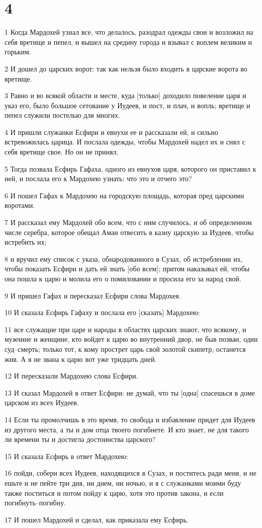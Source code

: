 \chapter{4}

\par 1 Когда Мардохей узнал все, что делалось, разодрал одежды свои и возложил на себя вретище и пепел, и вышел на средину города и взывал с воплем великим и горьким.
\par 2 И дошел до царских ворот; так как нельзя было входить в царские ворота во вретище.
\par 3 Равно и во всякой области и месте, куда [только] доходило повеление царя и указ его, было большое сетование у Иудеев, и пост, и плач, и вопль; вретище и пепел служили постелью для многих.
\par 4 И пришли служанки Есфири и евнухи ее и рассказали ей, и сильно встревожилась царица. И послала одежды, чтобы Мардохей надел их и снял с себя вретище свое. Но он не принял.
\par 5 Тогда позвала Есфирь Гафаха, одного из евнухов царя, которого он приставил к ней, и послала его к Мардохею узнать: что это и отчего это?
\par 6 И пошел Гафах к Мардохею на городскую площадь, которая пред царскими воротами.
\par 7 И рассказал ему Мардохей обо всем, что с ним случилось, и об определенном числе серебра, которое обещал Аман отвесить в казну царскую за Иудеев, чтобы истребить их;
\par 8 и вручил ему список с указа, обнародованного в Сузах, об истреблении их, чтобы показать Есфири и дать ей знать [обо всем]; притом наказывал ей, чтобы она пошла к царю и молила его о помиловании и просила его за народ свой.
\par 9 И пришел Гафах и пересказал Есфири слова Мардохея.
\par 10 И сказала Есфирь Гафаху и послала его [сказать] Мардохею:
\par 11 все служащие при царе и народы в областях царских знают, что всякому, и мужчине и женщине, кто войдет к царю во внутренний двор, не быв позван, один суд--смерть; только тот, к кому прострет царь свой золотой скипетр, останется жив. А я не звана к царю вот уже тридцать дней.
\par 12 И пересказали Мардохею слова Есфири.
\par 13 И сказал Мардохей в ответ Есфири: не думай, что ты [одна] спасешься в доме царском из всех Иудеев.
\par 14 Если ты промолчишь в это время, то свобода и избавление придет для Иудеев из другого места, а ты и дом отца твоего погибнете. И кто знает, не для такого ли времени ты и достигла достоинства царского?
\par 15 И сказала Есфирь в ответ Мардохею:
\par 16 пойди, собери всех Иудеев, находящихся в Сузах, и поститесь ради меня, и не ешьте и не пейте три дня, ни днем, ни ночью, и я с служанками моими буду также поститься и потом пойду к царю, хотя это против закона, и если погибнуть--погибну.
\par 17 И пошел Мардохей и сделал, как приказала ему Есфирь.

